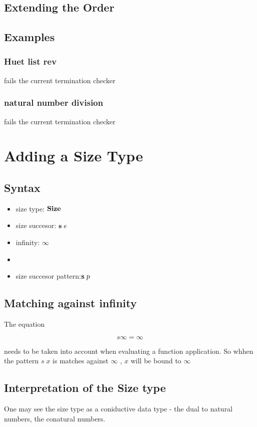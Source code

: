 \section{Extending the Order}

\section{Examples}

\subsection{Huet list rev}
fails the current termination checker
\subsection{natural number division}
fails the current termination checker
\chapter{Adding a Size Type}

\section{Syntax}

\begin{itemize}
\item
size type: $ \mathbf{Size} $ 
\item
size succesor: $\mathbf{s}\; e $ 
\item
infinity: $\infty$ 
\item
\end{itemize}

\begin{itemize}
\item
size succesor pattern:$ \mathbf{s}\; p $ 
\end{itemize}

\section{Matching against infinity}
The equation 

\[ s \infty = \infty \]

needs to be taken into account when evaluating a function application.
So whhen the pattern $ s \; x $ is matches against $ \infty $ , $x$ will be bound to $ \infty $  

\section{Interpretation of the Size type}
One may see the size type as a coniductive data type - the dual to natural numbers, the conatural numbers.


